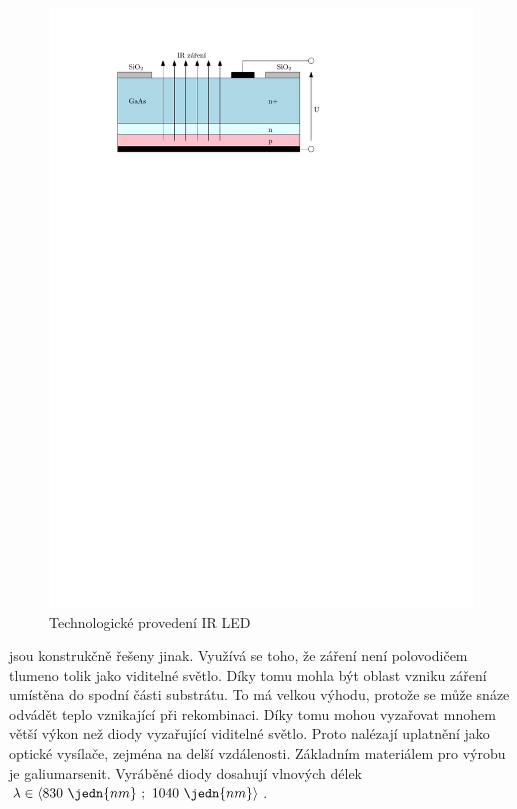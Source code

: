 \begin{figure}[H]
    \begin{center}
        \includegraphics[scale=1]{img/ir-led}
    \end{center}
    \caption{Technologické provedení IR LED}
\end{figure}

  jsou konstrukčně řešeny jinak. Využívá se toho, že  záření není polovodičem tlumeno tolik jako viditelné světlo. Díky tomu mohla být oblast vzniku záření umístěna do spodní části substrátu. To má velkou výhodu, protože se může snáze odvádět teplo vznikající při rekombinaci. Díky tomu mohou   vyzařovat mnohem větší výkon než diody vyzařující viditelné světlo. Proto nalézají uplatnění jako optické vysílače, zejména na delší vzdálenosti. Základním materiálem pro výrobu   je galiumarsenit. Vyráběné diody dosahují vlnových délek $\lambda \in \langle 830~\jedn{nm}~;~1040~\jedn{nm} \rangle$.

